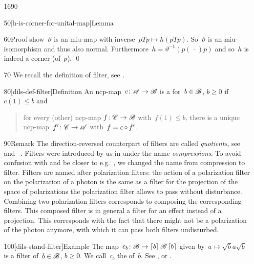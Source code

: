 \begin{parsec}{1690}
\begin{point}{50}[h-is-corner-for-unital-map]{Lemma}
\begin{point}{60}{Proof}
    show~$\vartheta$ is an miu-map
    with inverse~$pTp \mapsto h(pTp)$.
So~$\vartheta$ is an miu-isomorphism and thus also normal.
    Furthermore~$h = \vartheta^{-1}(p (\,\cdot\,) p)$
     and so~$h$ is indeed a corner (of~$p$). \qed
\end{point}
\end{point}
\begin{point}{70}%
We recall the definition of filter, see . 
\end{point}
\begin{point}{80}[dils-def-filter]{Definition}%
An ncp-map~$c \colon \mathscr{A} \to \mathscr{B}$
is a  for~$b \in\mathscr{B}$, $b \geq 0$ if~$c(1)\leq b$
    and
    \begin{quote}
        for every (other) ncp-map $f\colon \mathscr{C} \to \mathscr{B}$
            with~$f(1) \leq b$,
            there is a unique ncp-map~$f'\colon \mathscr{C} \to \mathscr{A}$
            with~$f = c \mathop{\circ} f'$.
    \end{quote}
\begin{point}{90}{Remark}%
The direction-reversed counterpart
    of filters are called \emph{quotients},
    see~ and~\cite{effintro} .
Filters were introduced by us in \cite[Dfn.~2]{westerbaan2016universal}
    under the name \emph{compressions}.
To avoid confusion with \cite{alfsen2012}
    and be closer to e.g.~\cite{wilce2016royal},
    we changed the name from compression to filter.
Filters are named after polarization filters:
    the action of a polarization filter on the polarization
        of a photon is the same as a filter for
        the projection of the space of polarizations
        the polarization filter allows to pass without disturbance.
Combining two polarization filters corresponds
    to composing the corresponding filters.
This composed filter is in general a filter for an effect instead
    of a projection.
This corresponds with the fact that there might not be a polarization
    of the photon anymore,
    with which it can pass both filters undisturbed.
\end{point}
\end{point}
\begin{point}{100}[dils-stand-filter]{Example}%
    The map~$c_b\colon \mathscr{B} \to \left\lceil b\right\rceil \mathscr{B} \left\lceil b\right\rceil$
        given by~$a \mapsto \sqrt{b} a \sqrt{b}$ is a filter
        of~$b\in \mathscr{B}$, $b\geq 0$.
        We call~$c_b$ the  of~$b$.
    See , 
        or \cite[Prop.~6]{westerbaan2016universal}.

\end{point}
\end{parsec}
